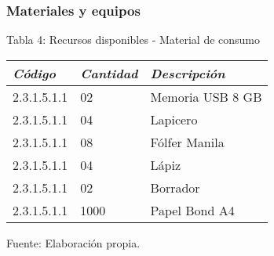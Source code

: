     \subsubsection{Materiales y equipos}
            \begin{table}[h!]
                \centering
                { Tabla 4: Recursos disponibles - Material de consumo}\par
                \begin{tabular}{|p{3cm}|p{2cm}|p{5cm}|} \hline
                    
                
                \textit{{\bf{Código}}} &
                \textit{{\bf{Cantidad}}} &
                \textit{{\bf{Descripción}}}
                \\ \hline

                2.3.1.5.1.1 &
                02 &
                Memoria USB 8 GB
                \\ \hline

                2.3.1.5.1.1 &
                04 &
                Lapicero
                \\ \hline

                2.3.1.5.1.1 &
                08 &
                Fólfer Manila
                \\ \hline

                2.3.1.5.1.1 &
                04 &
                Lápiz
                \\ \hline

                2.3.1.5.1.1 &
                02 &
                Borrador
                \\ \hline

                2.3.1.5.1.1 &
                1000 &
                Papel Bond A4
                \\ \hline

                \end{tabular}
                \begin{center}
                    \vskip -0.2cm
                    {\small{Fuente: Elaboración propia.}}
                \end{center}
            \end{table}
